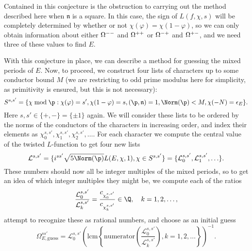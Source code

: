 \documentclass{amsart}
\newcommand{\n}{\mathfrak{n}}
\renewcommand{\phi}{\varphi}
\begin{document}
\begin{remark}
Contained in this conjecture is the obstruction to carrying out the method described here when 
$\n$ is a square. In this case, the sign of $L(f, \chi, s)$ will be completely determined by
whether or not $\chi(\varphi) = \chi(1 - \varphi)$, so we can only obtain information about
either $\Omega^{--}$ and $\Omega^{++}$ or $\Omega^{-+}$ and $\Omega^{+-}$, and we need three of these
values to find $E$.
\end{remark}

With this conjecture in place, we can describe a method for guessing the mixed periods of
$E$.
Now, to proceed, we construct four lists of characters
up to some conductor bound $M$ (we are restricting to odd prime modulus here for simplicity,
as primitivity is ensured, but this is not necessary):
\[
    S^{s,s'} = \{ \chi \bmod \p : \chi(\phi) = s', \chi(1 - \phi) = s,
            (\p, \n) = 1, \Norm(\p) < M, \chi(-N) = \epsilon_E\}.
\]
Here $s, s' \in \{+, -\} = \{ \pm 1 \}$ again. We will consider these lists to be ordered by the
norms of the conductors of the characters in increasing order, and index their elements as
$\chi^{s,s'}_0, \chi^{s,s'}_1, \chi^{s,s'}_2, \ldots$. For each character we compute the central
value of the twisted $L$-function to get four new lists
\[
    \mathcal{L}^{s,s'} = \{ i^{ss'}\sqrt{5 \Norm(\p) } L(E,\chi,1), \chi \in S^{s,s'}\} =
        \{\mathcal{L}^{s,s'}_0, \mathcal{L}^{s,s'}_1, \ldots\}.
\]
These numbers should now all be integer multiples of the mixed periods, so to get an idea
of which integer multiples they might be, we compute each of the ratios 
\[
    \frac{\mathcal{L}^{s,s'}_0}{\mathcal{L}^{s,s'}_k} = \frac{c_{\chi^{s,s'}_0}}{c_{\chi^{s,s'}_k}} \in \Q,\quad  k = 1, 2, \ldots,
\]
attempt to recognize these as rational numbers, and 
choose as an initial guess
\[
    \Omega^{ss'}_{E, \mathrm{guess}} = \mathcal{L}^{s,s'}_0\left(\mathrm{lcm}\left\{ \mathrm{numerator}\left(\frac{\mathcal{L}^{s,s'}_0}{\mathcal{L}^{s,s'}_k}\right), k = 1,2, \ldots \right\}\right)^{-1}.
\]
\end{document}

